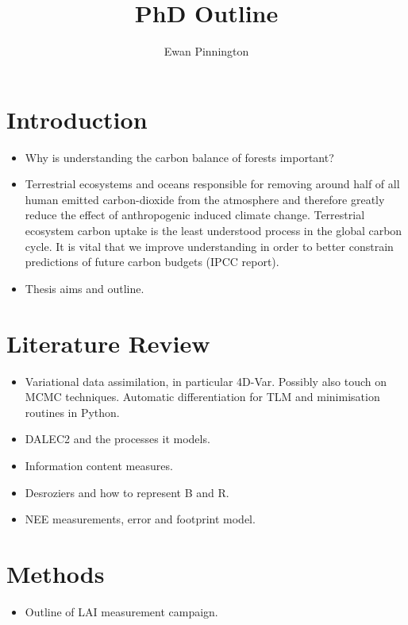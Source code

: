 \documentclass[11pt]{article}
\title{PhD Outline}
\author{Ewan Pinnington}
\begin{document}
\maketitle

\section{Introduction}
\begin{itemize}
\item Why is understanding the carbon balance of forests important?
\item Terrestrial ecosystems and oceans responsible for removing around half of all human emitted carbon-dioxide from the atmosphere and therefore greatly reduce the effect of anthropogenic induced climate change. Terrestrial ecosystem carbon uptake is the least understood process in the global carbon cycle. It is vital that we improve understanding in order to better constrain predictions of future carbon budgets (IPCC report).
\item Thesis aims and outline.
\end{itemize}


\section{Literature Review}
\begin{itemize}
\item Variational data assimilation, in particular 4D-Var. Possibly also touch on MCMC techniques. Automatic differentiation for TLM and minimisation routines in Python.
\item DALEC2 and the processes it models.
\item Information content measures.
\item Desroziers and how to represent B and R.
\item NEE measurements, error and footprint model.
\end{itemize}


\section{Methods}
\begin{itemize}
\item Outline of LAI measurement campaign.
\end{itemize}
\end{document}
